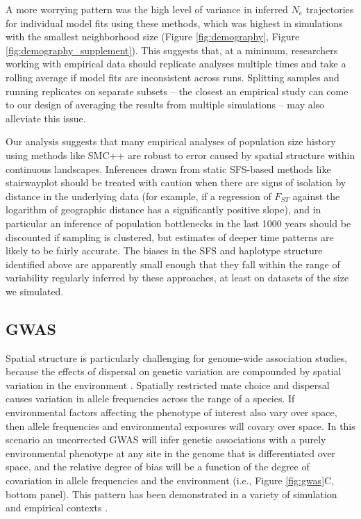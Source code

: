 \documentclass[10pt,twoside,lineno,hidelinks]{preprint}
\begin{document}
A more worrying pattern was the high level of variance in inferred $N_{e}$ trajectories for individual model fits using these methods, which was highest in simulations with the smallest neighborhood size (Figure \ref{fig:demography}, Figure \ref{fig:demography_supplement}). This suggests that, at a minimum, researchers working with empirical data should replicate analyses multiple times and take a rolling average if model fits are inconsistent across runs. Splitting samples and running replicates on separate subsets -- the closest an empirical study can come to our design of averaging the results from multiple simulations -- may also alleviate this issue.  

Our analysis suggests that many empirical analyses of population size history using methods like SMC++ are robust to error caused by spatial structure within continuous landscapes. Inferences drawn from static SFS-based methods like stairwayplot should be treated with caution when there are signs of isolation by distance in the underlying data (for example, if a regression of $F_{ST}$ against the logarithm of geographic distance has a significantly positive slope), and in particular an inference of population bottlenecks in the last 1000 years should be discounted if sampling is clustered, but estimates of deeper time patterns are likely to be fairly accurate. The biases in the SFS and haplotype structure identified above \citep[see also][]{Wakeley1999,Chikhi2010,Stadler2009} are apparently small enough that they fall within the range of variability regularly inferred by these approaches, at least on datasets of the size we simulated.  

\subsection{GWAS}

Spatial structure is particularly challenging for genome-wide association studies, because the effects of dispersal on genetic variation are compounded by spatial variation in the environment \citep{Mathieson2012}. Spatially restricted mate choice and dispersal causes variation in allele frequencies across the range of a species. If environmental factors affecting the phenotype of interest also vary over space, then allele frequencies and environmental exposures will covary over space. 
In this scenario an uncorrected GWAS will infer genetic associations with a purely environmental phenotype at any site in the genome that is differentiated over space, and the relative degree of bias will be a function of the degree of covariation in allele frequencies and the environment (i.e., Figure \ref{fig:gwas}C, bottom panel). This pattern has been demonstrated in a variety of simulation and empirical contexts \citep{Price2006,Yu2006,Young2018,Mathieson2012,Kang2008,Kang2010,Bulik-Sullivan2015,Berg2018,Sohail2018}. 
\end{document}
